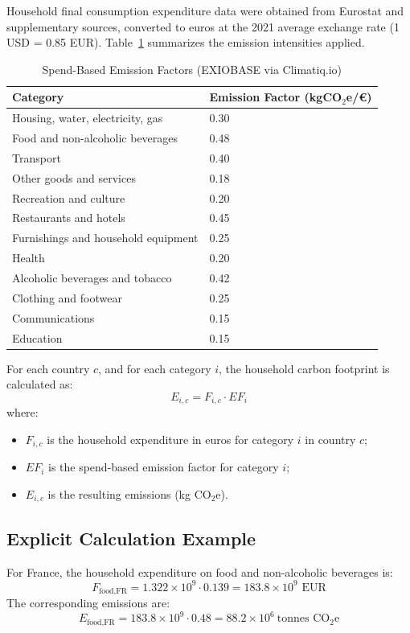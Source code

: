 \documentclass[12pt,a4paper]{article}%
\begin{document}
Household final consumption expenditure data were obtained from Eurostat and supplementary sources, converted to euros at the 2021 average exchange rate (1 USD = 0.85 EUR). Table~\ref{tab:efactors} summarizes the emission intensities applied.

\begin{table}[h]
\centering
\caption{Spend-Based Emission Factors (EXIOBASE via Climatiq.io)}
\label{tab:efactors}
\begin{tabular}{@{}ll@{}}
\toprule
\textbf{Category} & \textbf{Emission Factor (kgCO$_{2}$e/€)}\\
\midrule
Housing, water, electricity, gas & 0.30\\
Food and non-alcoholic beverages & 0.48\\
Transport & 0.40\\
Other goods and services & 0.18\\
Recreation and culture & 0.20\\
Restaurants and hotels & 0.45\\
Furnishings and household equipment & 0.25\\
Health & 0.20\\
Alcoholic beverages and tobacco & 0.42\\
Clothing and footwear & 0.25\\
Communications & 0.15\\
Education & 0.15\\
\bottomrule
\end{tabular}
\end{table}

For each country $c$, and for each category $i$, the household carbon footprint is calculated as:
\[
E_{i,c} = F_{i,c} \cdot EF_i
\]
where:
\begin{itemize}
    \item $F_{i,c}$ is the household expenditure in euros for category $i$ in country $c$;
    \item $EF_i$ is the spend-based emission factor for category $i$;
    \item $E_{i,c}$ is the resulting emissions (kg CO$_{2}$e).
\end{itemize}

\subsection{Explicit Calculation Example}

For France, the household expenditure on food and non-alcoholic beverages is:
\[
F_{\text{food,FR}} = 1.322 \times 10^9 \cdot 0.139 = 183.8 \times 10^9 \text{ EUR}
\]
The corresponding emissions are:
\[
E_{\text{food,FR}} = 183.8 \times 10^9 \cdot 0.48 = 88.2 \times 10^6 \ \text{tonnes CO}_{2}\text{e}
\]
\end{document}
